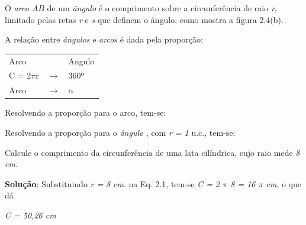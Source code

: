 O \textit{arco  \( AB   \) }de um\textit{ ângulo}  é o comprimento sobre a circunferência de raio \textit{r}, limitado pelas retas \textit{r} e \textit{s} que definem o ângulo, como mostra a figura 2.4(b).

A relação entre \textit{ângulos }e\textit{ arcos} é dada pela proporção:

\begin{table}[H]
\begin{tabular}{lll}
Arco    & & Angulo   \\
C = 2$\pi$r & $\rightarrow$ & 360º     \\
Arco    & $\rightarrow$ & $\alpha$
\end{tabular}
\end{table}

Resolvendo a proporção para o arco, tem-se:


Resolvendo a proporção para o \textit{ângulo} , com \textit{r = 1} u.c., tem-se:


\begin{texemplo}
Calcule o comprimento da circunferência de uma lata cilíndrica, cujo raio mede \textit{8 cm}.

\noindent\textbf{Solução}:  Substituindo  \textit{r =} \textit{8 cm}.  na Eq. 2.1, tem-se  \textit{C = 2 $ \pi $  8 = 16 $ \pi $  cm}, o que dá

\textit{C = 50,26 cm \qedsymbol}
\end{texemplo}

